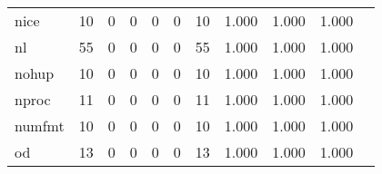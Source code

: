 \begin{longtable}{lp{1.2cm}p{1.2cm}p{1.2cm}p{1.2cm}p{1.2cm}p{1.2cm}p{1.2cm}p{1.2cm}p{1.2cm}p{1.2cm}}
nice      &                                    10 &                                                  0 &                                                  0 &                                                  0 &                                                  0 &                                                 10 &                                         1.000 &                                              1.000 &                                              1.000 \\
nl        &                                    55 &                                                  0 &                                                  0 &                                                  0 &                                                  0 &                                                 55 &                                         1.000 &                                              1.000 &                                              1.000 \\
nohup     &                                    10 &                                                  0 &                                                  0 &                                                  0 &                                                  0 &                                                 10 &                                         1.000 &                                              1.000 &                                              1.000 \\
nproc     &                                    11 &                                                  0 &                                                  0 &                                                  0 &                                                  0 &                                                 11 &                                         1.000 &                                              1.000 &                                              1.000 \\
numfmt    &                                    10 &                                                  0 &                                                  0 &                                                  0 &                                                  0 &                                                 10 &                                         1.000 &                                              1.000 &                                              1.000 \\
od        &                                    13 &                                                  0 &                                                  0 &                                                  0 &                                                  0 &                                                 13 &                                         1.000 &                                              1.000 &                                              1.000 \\

\end{longtable}
